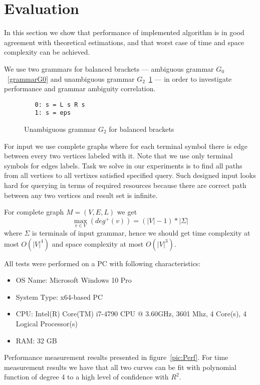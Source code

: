 \section{Evaluation}

In this section we show that performance of implemented algorithm is in good agreement with theoretical estimations, and that worst case of time and space complexity can be achieved.  

We use two grammars for balanced brackets --- ambiguous grammar $G_0$~\ref{grammarG0} and unambiguous grammar $G_2$~\ref{grammarG2} --- in order to investigate performance and grammar ambiguity correlation.

\begin{figure}[ht]
   \begin{center}
\begin{verbatim}
   0: s = L s R s 
   1: s = eps
\end{verbatim}
   \caption{Unambiguous grammar $G_2$ for balanced brackets}
   \label{grammarG2}        
   \end{center}
\end{figure}

For input we use complete graphs where for each terminal symbol there is edge between every two vertices labeled with it.
Note that we use only terminal symbols for edges labels.  
Task we solve in our experiments is to find all paths from all vertices to all vertixes satisfied specified query.
Such designed input looks hard for querying in terms of required resources because there are correct path between any two vertices and result set is infinite.

For complete graph $M=(V,E,L)$ we get $$\max\limits_{v \in V}\left(deg^+\left(v\right)\right) = (|V| - 1)*|\Sigma|$$ where $\Sigma$ is terminals of input grammar, hence we should get time complexity at most $O(|V|^4)$ and space complexity at most $O(|V|^3)$.

All tests were performed on a PC with following characteristics:
\begin{itemize}
\item OS Name: Microsoft Windows 10 Pro
\item System Type: x64-based PC
\item CPU: Intel(R) Core(TM) i7-4790 CPU @ 3.60GHz, 3601 Mhz, 4 Core(s), 4 Logical Processor(s)
\item RAM: 32 GB
\end{itemize}

Performance measurement results presented in figure~\ref{pic:Perf}. 
For time measurement results we have that all two curves can be fit with polynomial function of degree 4 to a high level of confidence with $R^2$. 

